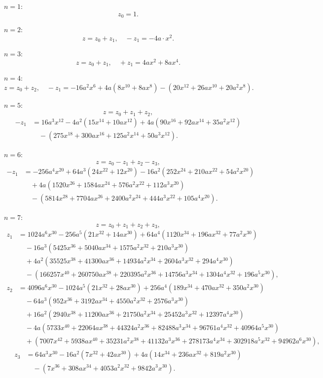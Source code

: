 \documentclass[12pt,a4paper]{article}
\theoremstyle{definition}
\begin{document}
$n = 1$:
\[z_0 = 1.\]

$n = 2$:
\[z = z_0 + z_1, \quad -z_1 = -4a \cdot x^2.\]

$n = 3$:
\[z = z_0 + z_1, \quad +z_1 = 4ax^2 + 8ax^4.\]

$n = 4$:
\[z = z_0 + z_2, \quad -z_1 = -16a^2 x^6 + 4a(8x^{10} + 8ax^8) - (20x^{12} + 26ax^{10} + 20a^2x^8).\]

$n = 5$:
\[z = z_0 + z_1 + z_2,\]
\begin{align*}
-z_1 &= 16a^3 x^{12} - 4a^2(15x^{14} + 10ax^{12}) + 4a(90x^{16} + 92ax^{14} + 35a^2x^{12}) \\
&\quad - (275x^{18} + 300ax^{16} + 125a^2x^{14} + 50a^3x^{12}).
\end{align*}

$n = 6$:
\[z = z_0 - z_1 + z_2 - z_3,\]
\begin{align*}
-z_1 &= -256a^4 x^{20} + 64a^3(24x^{22} + 12x^{20}) - 16a^2(252x^{24} + 210ax^{22} + 54a^2x^{20}) \\
&\quad + 4a(1520x^{26} + 1584ax^{24} + 576a^2x^{22} + 112a^3x^{20}) \\
&\quad - (5814x^{28} + 7704ax^{26} + 2400a^2x^{24} + 444a^3x^{22} + 105a^4x^{20}).
\end{align*}

$n = 7$:
\[z = z_0 + z_1 + z_2 + z_3,\]
\begin{align*}
z_1 &= 1024a^6 x^{30} - 256a^5(21x^{32} + 14ax^{30}) + 64a^4(1120x^{34} + 196ax^{32} + 77a^2x^{30}) \\
&\quad - 16a^3(5425x^{36} + 5040ax^{34} + 1575a^2x^{32} + 210a^3x^{30}) \\
&\quad + 4a^2(35525x^{38} + 41300ax^{36} + 14934a^2x^{34} + 2604a^3x^{32} + 294a^4x^{30}) \\
&\quad - (166257x^{40} + 260750ax^{38} + 220395a^2x^{36} + 14756a^3x^{34} + 1304a^4x^{32} + 196a^5x^{30}),
\end{align*}
\begin{align*}
z_2 &= 4096a^6 x^{30} - 1024a^5(21x^{32} + 28ax^{30}) + 256a^4(189x^{34} + 470ax^{32} + 350a^2x^{30}) \\
&\quad - 64a^3(952x^{36} + 3192ax^{34} + 4550a^2x^{32} + 2576a^3x^{30}) \\
&\quad + 16a^2(2940x^{38} + 11200ax^{36} + 21750a^2x^{34} + 25452a^3x^{32} + 12397a^4x^{30}) \\
&\quad - 4a(5733x^{40} + 22064ax^{38} + 44324a^2x^{36} + 82488a^3x^{34} + 96761a^4x^{32} + 40964a^5x^{30}) \\
&\quad + (7007x^{42} + 5938ax^{40} + 35231a^2x^{38} + 41132a^3x^{36} + 278173a^4x^{34} + 302918a^5x^{32} + 94962a^6x^{30}),
\end{align*}
\begin{align*}
z_3 &= 64a^3 x^{30} - 16a^2(7x^{32} + 42ax^{30}) + 4a(14x^{34} + 236ax^{32} + 819a^2x^{30}) \\
&\quad - (7x^{36} + 308ax^{34} + 4053a^2x^{32} + 9842a^3x^{30}).
\end{align*}
\end{document}
